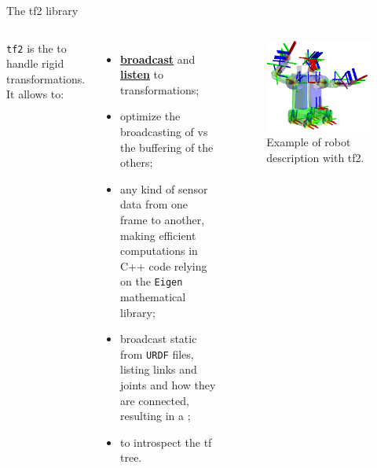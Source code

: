 \begin{frame}{The tf2 library}
	\begin{columns}
		\texttt{tf2} is the  to handle rigid transformations. It allows to:
		\begin{itemize}
			\item \href{https://docs.ros.org/en/humble/Tutorials/Intermediate/Tf2/Writing-A-Tf2-Broadcaster-Cpp.html}{\color{blue}\underline{\textbf{broadcast}}} and \href{https://docs.ros.org/en/humble/Tutorials/Intermediate/Tf2/Writing-A-Tf2-Listener-Cpp.html}{\color{blue}\underline{\textbf{listen}}} to transformations;
			\item optimize the broadcasting of  vs the buffering of the others;
			\item {} any kind of sensor data from one frame to another, making efficient computations in C++ code relying on the \texttt{Eigen} mathematical library;
			\item broadcast static  from \texttt{URDF} files, listing links and joints and how they are connected, resulting in a ;
			\item {} to introspect the tf tree.
		\end{itemize}

		\begin{figure}
			\centering
			\includegraphics[width=.9\textwidth]{ros2_tf2}
			\caption{Example of robot description with tf2.}
			\label{fig:tf2example}
		\end{figure}
	\end{columns}
\end{frame}
